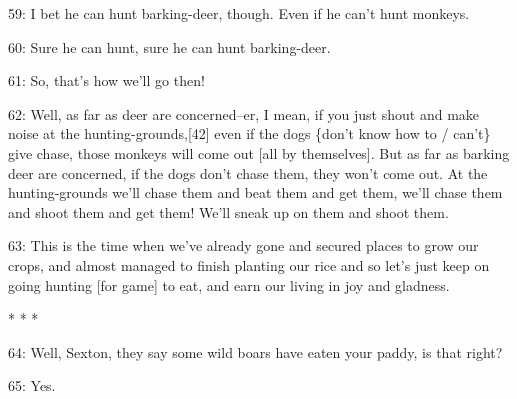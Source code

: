 59: I bet he can hunt barking-deer, though. Even if he can't hunt monkeys.

60: Sure he can hunt, sure he can hunt barking-deer.

61: So, that's how we'll go then!

62: Well, as far as deer are concerned--er, I mean, if you just shout and make
noise at the hunting-grounds,[42] even if the dogs \{don't know how to / can't\}
give chase, those monkeys will come out [all by themselves]. But as far as barking
deer are concerned, if the dogs don't chase them, they won't come out. At the hunting-grounds
we'll chase them and beat them and get them, we'll chase them and shoot them and
get them! We'll sneak up on them and shoot them.

63: This is the time when we've already gone and secured places to grow our crops,
and almost managed to finish planting our rice and so let's just keep on going
hunting [for game] to eat, and earn our living in joy and gladness.

\begin{center}
* * *
\end{center}

\leftskip=0pt
64: Well, Sexton, they say some wild boars have eaten your paddy, is that right?

65: Yes.

